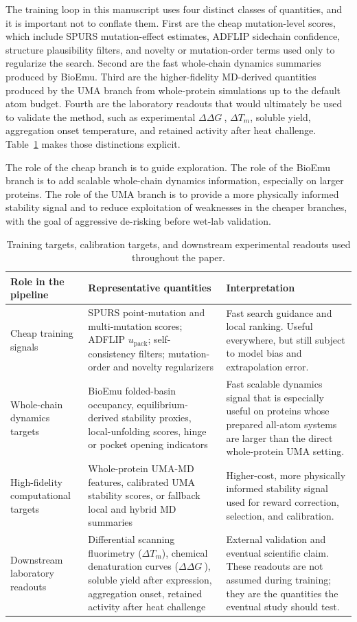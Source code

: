 \documentclass[11pt]{article}
\newcommand{\packunc}{\ensuremath{u_{\mathrm{pack}}}}
\newcommand{\ddG}{\ensuremath{\Delta\Delta G \ }}
\begin{document}
The training loop in this manuscript uses four distinct classes of quantities, and it is important not to conflate them. First are the cheap mutation-level scores, which include SPURS mutation-effect estimates, ADFLIP sidechain confidence, structure plausibility filters, and novelty or mutation-order terms used only to regularize the search. Second are the fast whole-chain dynamics summaries produced by BioEmu. Third are the higher-fidelity MD-derived quantities produced by the UMA branch from whole-protein simulations up to the default atom budget. Fourth are the laboratory readouts that would ultimately be used to validate the method, such as experimental \ddG, $\Delta T_m$, soluble yield, aggregation onset temperature, and retained activity after heat challenge. Table~\ref{tab:targetsreadouts} makes those distinctions explicit.

The role of the cheap branch is to guide exploration. The role of the BioEmu branch is to add scalable whole-chain dynamics information, especially on larger proteins. The role of the UMA branch is to provide a more physically informed stability signal and to reduce exploitation of weaknesses in the cheaper branches, with the goal of aggressive de-risking before wet-lab validation. 

\begin{table}[H]
\centering
\caption{Training targets, calibration targets, and downstream experimental readouts used throughout the paper.}
\label{tab:targetsreadouts}
\begin{tabularx}{\textwidth}{>{\raggedright\arraybackslash}p{} >{\raggedright\arraybackslash}p{} >{\raggedright\arraybackslash}X}
\toprule
Role in the pipeline & Representative quantities & Interpretation \\
\midrule
Cheap training signals & SPURS point-mutation and multi-mutation scores; ADFLIP \packunc; self-consistency filters; mutation-order and novelty regularizers & Fast search guidance and local ranking. Useful everywhere, but still subject to model bias and extrapolation error. \\
Whole-chain dynamics targets & BioEmu folded-basin occupancy, equilibrium-derived stability proxies, local-unfolding scores, hinge or pocket opening indicators & Fast scalable dynamics signal that is especially useful on proteins whose prepared all-atom systems are larger than the direct whole-protein UMA setting. \\
High-fidelity computational targets & Whole-protein UMA-MD features, calibrated UMA stability scores, or fallback local and hybrid MD summaries & Higher-cost, more physically informed stability signal used for reward correction, selection, and calibration. \\
Downstream laboratory readouts & Differential scanning fluorimetry ($\Delta T_m$), chemical denaturation curves (\ddG), soluble yield after expression, aggregation onset, retained activity after heat challenge & External validation and eventual scientific claim. These readouts are not assumed during training; they are the quantities the eventual study should test. \\
\bottomrule
\end{tabularx}
\end{table}
\end{document}
